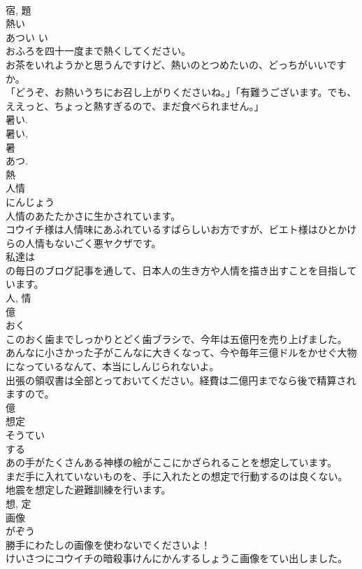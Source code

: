 \documentclass[8pt]{extreport}
\begin{document}
\begin{CJK}{UTF8}{min}
\\	宿, 題	
\\	熱い	
\\	あつい	い 
\\	おふろを四十一度まで熱くしてください。	
\\	お茶をいれようかと思うんですけど、熱いのとつめたいの、どっちがいいですか。	
\\	「どうぞ、お熱いうちにお召し上がりくださいね。」「有難うございます。でも、ええっと、ちょっと熱すぎるので、まだ食べられません。」	
\\	暑い. 
\\	暑い, 
\\	暑 
\\	あつ. 
\\	熱	
\\	人情	
\\	にんじょう	
\\	人情のあたたかさに生かされています。	
\\	コウイチ様は人情味にあふれているすばらしいお方ですが、ビエト様はひとかけらの人情もないごく悪ヤクザです。	
\\	私達は
\\	の毎日のブログ記事を通して、日本人の生き方や人情を描き出すことを目指しています。	
\\	人, 情	
\\	億	
\\	おく	
\\	このおく歯までしっかりとどく歯ブラシで、今年は五億円を売り上げました。	
\\	あんなに小さかった子がこんなに大きくなって、今や毎年三億ドルをかせぐ大物になっているなんて、本当にしんじられないよ。	
\\	出張の領収書は全部とっておいてください。経費は二億円までなら後で精算されますので。	
\\	億	
\\	想定	
\\	そうてい	
\\	する 
\\	あの手がたくさんある神様の絵がここにかざられることを想定しています。	
\\	まだ手に入れていないものを、手に入れたとの想定で行動するのは良くない。	
\\	地震を想定した避難訓練を行います。	
\\	想, 定	
\\	画像	
\\	がぞう	
\\	勝手にわたしの画像を使わないでくださいよ！	
\\	けいさつにコウイチの暗殺事けんにかんするしょうこ画像をてい出しました。	

\end{CJK}
\end{document}
